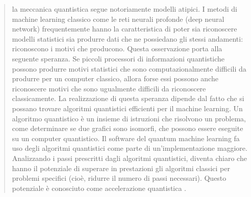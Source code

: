\begin{quote}
    la meccanica quantistica segue notoriamente modelli atipici. 
    I metodi di machine learning classico come le reti neurali profonde 
    (deep neural network) frequentemente hanno la caratteristica di poter sia 
    riconoscere modelli statistici sia produrre dati che ne possiedano gli 
    stessi andamenti: riconoscono i motivi che producono. Questa osservazione 
    porta alla seguente speranza. Se piccoli processori di informazioni 
    quantistiche possono produrre motivi statistici che sono computazionalmente 
    difficili da produrre per un computer classico, allora forse essi possono 
    anche riconoscere motivi che sono ugualmente difficili da riconoscere 
    classicamente. 
    La realizzazione di questa speranza dipende dal fatto che si possano trovare algoritmi 
    quantistici efficienti per il machine learning. Un algoritmo quantistico è un insieme di 
    istruzioni che risolvono un problema, come determinare se due grafici sono isomorfi, 
    che possono essere eseguite su un computer quantistico. Il software del quantum machine 
    learning fa uso degli algoritmi quantistici come parte di un'implementazione maggiore. 
    Analizzando i passi prescritti dagli algoritmi quantistici, diventa chiaro che hanno il 
    potenziale di superare in prestazioni gli algoritmi classici per problemi specifici (cioè, 
    ridurre il numero di passi necessari). Questo potenziale è conosciuto come accelerazione 
    quantistica \cite{Ronnow420}. 
\end{quote}

